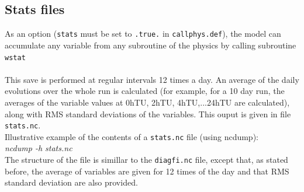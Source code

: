 \subsection{Stats files}

As an option ({\tt stats} must be set to {\tt .true.} in {\tt callphys.def}),
the model can accumulate any
variable from any subroutine of the physics by calling
subroutine \verb+ wstat+ 
\\ \\ 
\noindent
This save is performed at regular intervals 12 times a day.
An average of the daily evolutions over the whole run is calculated
(for example, for a 10 day run, the averages of the variable values at
0hTU, 2hTU, 4hTU,...24hTU are calculated), along with RMS standard
deviations of the variables. This ouput is given in 
file {\tt stats.nc}.\\


\noindent
Illustrative example of the contents of a {\tt stats.nc} file (using ncdump):\\
\noindent
{\it ncdump -h stats.nc}\\


\noindent
The structure of the file is simillar to the {\tt diagfi.nc} file,
except that, as stated before, the average of variables are given for
12 times of the day and that RMS standard deviation are also provided.

